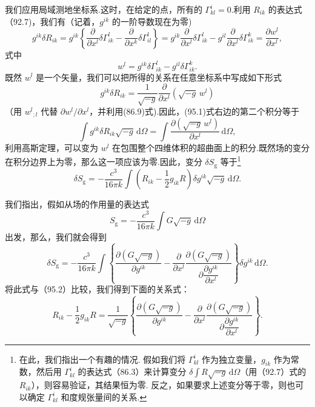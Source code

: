 我们应用局域测地坐标系.这时，在给定的点，所有的 $\Gamma^i_{kl}=0$.利用 $R_{ik}$ 的表达式（92.7)，我们有（记着，$g^{ik}$ 的一阶导数现在为零)
\begin{equation*}
  g^{ik}\delta R_{ik}
  =g^{ik}\left\{\frac{\partial}{\partial x^l}\delta\Gamma^l_{ik}
  -\frac{\partial}{\partial x^k}\delta\Gamma^l_{il}\right\}
  =g^{ik}\frac{\partial}{\partial x^l}\delta\Gamma^l_{ik}
  -g^{il}\frac{\partial}{\partial x^l}\delta\Gamma^k_{ik}
  =\frac{\partial w^l}{\partial x^l},
\end{equation*}
式中
\begin{equation*}
  w^l=g^{ik}\delta\Gamma^l_{ik}-g^{il}\delta\Gamma^k_{ik}.
\end{equation*}
既然 $w^l$ 是一个矢量，我们可以把所得的关系在任意坐标系中写成如下形式
\begin{equation*}
  g^{ik}\delta R_{ik}=\frac{1}{\sqrt{-g}}
  \frac{\partial}{\partial x^l}\left(\sqrt{-g}\,w^l\right)
\end{equation*}
（用 $w^l{}_{;l}$ 代替 $\partial w^l/\partial x^l$，并利用(86.9)式).因此，(95.1)式右边的第二个积分等于
\begin{equation*}
  \int g^{ik}\delta R_{ik}\sqrt{-g}\,\mathrm{d}\varOmega
  =\int\frac{\partial(\sqrt{-g}\,w^l)}{\partial x^l}\,\mathrm{d}\varOmega,
\end{equation*}
利用高斯定理，可以变为 $w^l$ 在包围整个四维体积的超曲面上的积分.既然场的变分在积分边界上为零，那么这一项应该为零.因此，变分 $\delta S_{\mathrm{g}}$ 等于\footnote{在此，我们指出一个有趣的情况. 假如我们将 $\Gamma^i_{kl}$ 作为独立变量，$g_{ik}$ 作为常数，然后用 $\Gamma^i_{kl}$ 的表达式（86.3）来计算变分 $\delta\int R\sqrt{-g}\,\mathrm{d}\varOmega$（用（92.7）式的 $R_{ik}$），则容易验证，其结果恒为零. 反之，如果要求上述变分等于零，则也可以确定 $\Gamma^i_{kl}$ 和度规张量间的关系.}
\begin{equation}
  \delta S_{\mathrm{g}}
  =-\frac{c^3}{16\pi k}\int\left(R_{ik}-\frac{1}{2}g_{ik}R\right)
  \delta g^{ik}\sqrt{-g}\,\mathrm{d}\varOmega.
\end{equation}

我们指出，假如从场的作用量的表达式
\begin{equation*}
  S_{\mathrm{g}}=-\frac{c^3}{16\pi k}\int G\sqrt{-g}\,\mathrm{d}\varOmega
\end{equation*}
出发，那么，我们就会得到
\begin{equation*}
  \delta S_{\mathrm{g}}=-\frac{c^3}{16\pi k}\int\left\{
  \frac{\partial(G\sqrt{-g})}{\partial g^{ik}}
  -\frac{\partial}{\partial x^l}
  \frac{\partial(G\sqrt{-g})}{\partial\dfrac{\partial g^{ik}}{\partial x^l}}
  \right\}\delta g^{ik}\,\mathrm{d}\varOmega.
\end{equation*}
将此式与（95.2）比较，我们得到下面的关系式：
\begin{equation}
  R_{ik}-\frac{1}{2}g_{ik}R=\frac{1}{\sqrt{-g}}\left\{
  \frac{\partial(G\sqrt{-g})}{\partial g^{ik}}
  -\frac{\partial}{\partial x^l}
  \frac{\partial(G\sqrt{-g})}{\partial\dfrac{\partial g^{ik}}{\partial x^l}}
  \right\}.
\end{equation}


